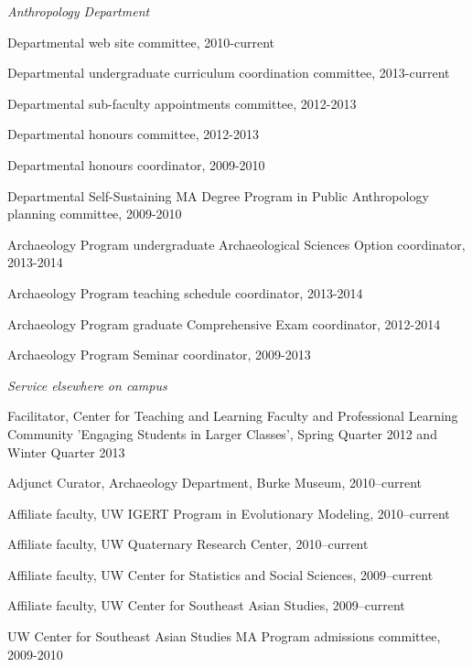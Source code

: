 
\medskip

\noindent\emph{Anthropology Department \vspace{0.01in}}

\ind Departmental web site committee, 2010-current

\ind Departmental undergraduate curriculum coordination committee, 2013-current

\ind Departmental sub-faculty appointments committee, 2012-2013

\ind Departmental honours committee, 2012-2013

\ind Departmental honours coordinator, 2009-2010

\ind Departmental Self-Sustaining MA Degree Program in Public Anthropology planning committee, 2009-2010

\ind Archaeology Program undergraduate Archaeological Sciences Option coordinator, 2013-2014

\ind Archaeology Program teaching schedule coordinator, 2013-2014

\ind Archaeology Program graduate Comprehensive Exam coordinator, 2012-2014

\ind Archaeology Program Seminar coordinator, 2009-2013

 \medskip

\noindent\emph{Service elsewhere on campus\vspace{0.01in}}

\ind Facilitator, Center for Teaching and Learning Faculty and Professional Learning Community 'Engaging Students in Larger Classes', Spring Quarter 2012 and Winter Quarter 2013

\ind Adjunct Curator, Archaeology Department, Burke Museum, 2010--current

\ind Affiliate faculty, UW IGERT Program in Evolutionary Modeling, 2010--current

\ind Affiliate faculty, UW Quaternary Research Center, 2010--current

\ind Affiliate faculty, UW Center for Statistics and Social Sciences, 2009--current

\ind Affiliate faculty, UW Center for Southeast Asian Studies, 2009--current

\ind UW Center for Southeast Asian Studies MA Program admissions committee, 2009-2010

